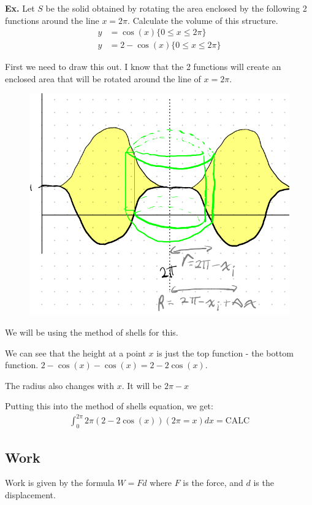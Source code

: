 \documentclass[12pt,letterpaper]{article} \usepackage{amsmath} \usepackage{graphicx}  \usepackage{longtable}  \usepackage{amssymb}
\begin{document}
            \begin{mdframed}
                \textbf{Ex. } Let $S$ be the solid obtained by rotating the area enclosed by the following 2 functions around the line $x=2\pi$. Calculate the volume of this structure. 
                \begin{align*}
                    y&=\cos(x) \{0\le x\le 2\pi\}\\
                    y&=2-\cos(x) \{0\le x\le 2\pi\}
                \end{align*}

                First we need to draw this out. I know that the 2 functions will create an enclosed area that will be rotated around the line of $x=2\pi$. 

                \begin{figure}[H]
                    \centering
                    \includegraphics[width=0.5\linewidth]{ex4.png}
                \end{figure}

                We will be using the method of shells for this.

                We can see that the height at a point $x$ is just the top function - the bottom function. $2-\cos(x) - \cos(x) = 2-2\cos(x)$.

                The radius also changes with $x$. It will be $2\pi -x$

                Putting this into the method of shells equation, we get:
                \begin{align*}
                    \int^{2\pi}_0 2\pi (2-2\cos(x))(2\pi =x)dx = \text{CALC}
                \end{align*}

            \end{mdframed}

        \subsection{Work}
        Work is given by the formula $W=Fd$ where $F$ is the force, and $d$ is the displacement.
\end{document}
